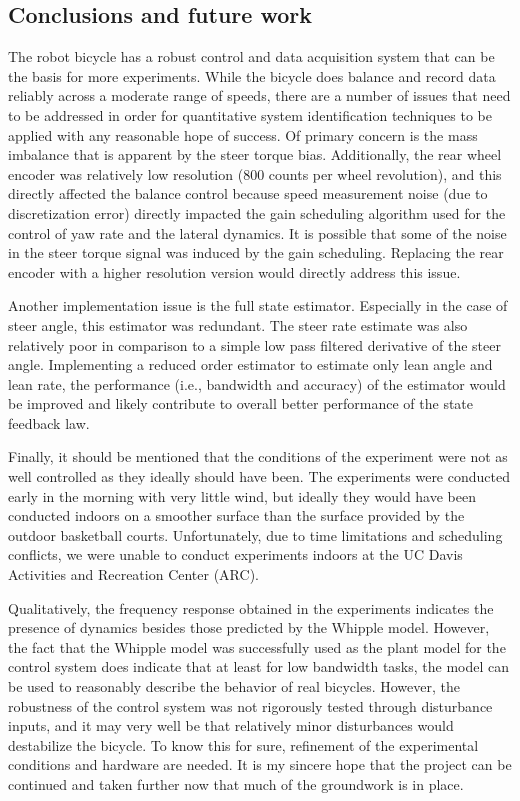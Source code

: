 \subsection{Conclusions and future work} \label{rb:subsec:conclusions}
The robot bicycle has a robust control and data acquisition system that can be
the basis for more experiments. While the bicycle does balance and record data
reliably across a moderate range of speeds, there are a number of issues that
need to be addressed in order for quantitative system identification techniques
to be applied with any reasonable hope of success. Of primary concern is the
mass imbalance that is apparent by the steer torque bias. Additionally, the
rear wheel encoder was relatively low resolution (800 counts per wheel
revolution), and this directly affected the balance control because speed
measurement noise (due to discretization error) directly impacted the gain
scheduling algorithm used for the control of yaw rate and the lateral dynamics.
It is possible that some of the noise in the steer torque signal was induced by
the gain scheduling. Replacing the rear encoder with a higher resolution
version would directly address this issue.

Another implementation issue is the full state estimator. Especially in the
case of steer angle, this estimator was redundant. The steer rate estimate was
also relatively poor in comparison to a simple low pass filtered derivative of
the steer angle. Implementing a reduced order estimator to estimate only lean
angle and lean rate, the performance (i.e., bandwidth and accuracy) of the
estimator would be improved and likely contribute to overall better performance
of the state feedback law.

Finally, it should be mentioned that the conditions of the experiment were not
as well controlled as they ideally should have been. The experiments were
conducted early in the morning with very little wind, but ideally they would
have been conducted indoors on a smoother surface than the surface provided by
the outdoor basketball courts. Unfortunately, due to time limitations and
scheduling conflicts, we were unable to conduct experiments indoors at the UC
Davis Activities and Recreation Center (ARC).

Qualitatively, the frequency response obtained in the experiments indicates the
presence of dynamics besides those predicted by the Whipple model.  However,
the fact that the Whipple model was successfully used as the plant model for
the control system does indicate that at least for low bandwidth tasks, the
model can be used to reasonably describe the behavior of real bicycles.
However, the robustness of the control system was not rigorously tested through
disturbance inputs, and it may very well be that relatively minor disturbances
would destabilize the bicycle. To know this for sure, refinement of the
experimental conditions and hardware are needed. It is my sincere hope that the
project can be continued and taken further now that much of the groundwork is
in place.

